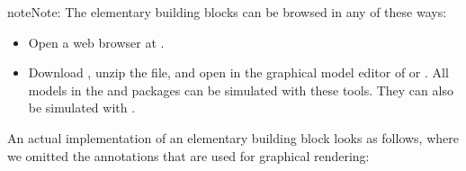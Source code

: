 \documentclass[letterpaper,10pt, openany,english]{sphinxmanual}
\begin{document}
\begin{sphinxadmonition}{note}{Note:}
The elementary building blocks can be browsed in any of these ways:
\begin{itemize}
\item {} 
Open a web browser at
.

\item {} 
Download , unzip the file,
and open  in the graphical model editor of
 or
.
All models in the  and  packages can be simulated with these tools.
They can also be simulated with .

\end{itemize}
\end{sphinxadmonition}

An actual implementation of an elementary building block
looks as follows, where we omitted the annotations that are
used for graphical rendering:
\end{document}
